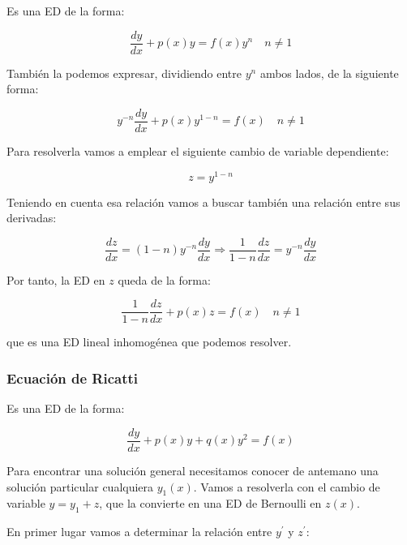 \documentclass[a4paper,12pt,titlepage]{article}
\begin{document}
Es una ED de la forma:

\begin{equation*}
    \frac{dy}{dx} + p(x)y = f(x)y^n \quad n\neq 1
\end{equation*}

También la podemos expresar, dividiendo entre $y^n$ ambos lados, de la siguiente forma:

\begin{equation*}
    y^{-n} \frac{dy}{dx} + p(x)y^{1-n} = f(x) \quad n\neq1
\end{equation*}

Para resolverla vamos a emplear el siguiente cambio de variable dependiente:

\begin{equation*}
    z = y^{1-n}
\end{equation*}

Teniendo en cuenta esa relación vamos a buscar también una relación entre sus derivadas:

\begin{equation*}
    \frac{dz}{dx} = (1-n)y^{-n}\frac{dy}{dx} \Rightarrow \frac{1}{1-n} \frac{dz}{dx} = y^{-n}\frac{dy}{dx}
\end{equation*}

Por tanto, la ED en $z$ queda de la forma:

\begin{equation*}
    \frac{1}{1-n} \frac{dz}{dx} + p(x)z = f(x) \quad n\neq 1
\end{equation*}

que es una ED lineal inhomogénea que podemos resolver.

\subsubsection{Ecuación de Ricatti}

Es una ED de la forma:

\begin{equation*}
    \frac{dy}{dx} + p(x)y + q(x)y^2 = f(x)
\end{equation*}

Para encontrar una solución general necesitamos conocer de antemano una solución particular cualquiera $y_1(x)$. Vamos a resolverla con el cambio de variable $y=y_1 + z$, que la convierte en una ED de Bernoulli en $z(x)$. 

\par En primer lugar vamos a determinar la relación entre $y^\prime$ y $z^\prime$:
\end{document}
